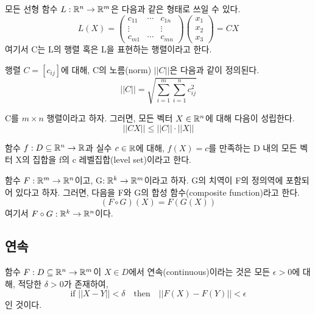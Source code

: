 \begin{theorem}
모든 선형 함수 $L: \mathbb{R}^n \to \mathbb{R}^m$은 다음과 같은 형태로 쓰일 수 있다.
\begin{equation*}
L(X)=\begin{pmatrix}
    c_{11} & \cdots & c_{1n} \\
    \vdots &  & \vdots \\
    c_{m1} & \cdots & c_{mn}
\end{pmatrix}
\begin{pmatrix}
x_1 \\ x_2 \\ x_3
\end{pmatrix}
=CX
\end{equation*}
여기서 C는 L의 행렬 혹은 L을 표현하는 행렬이라고 한다.
\end{theorem}

\begin{definition}[행렬 노름]
행렬 $C=[c_{ij}]$에 대해, C의 노름(norm) $||C||$은 다음과 같이 정의된다.
$$||C||=\sqrt{\sum_{i=1}^m \sum_{i=1}^n c_{ij}^2}$$
\end{definition}

\begin{theorem}
C를 $m \times n$ 행렬이라고 하자. 그러면, 모든 벡터 $X \in \mathbb{R}^n$에 대해 다음이 성립한다.
$$||CX|| \leq ||C|| \cdot ||X||$$
\end{theorem}

\begin{definition}[레벨 집합]
함수 $f: D \subseteq \mathbb{R}^n \to \mathbb{R}$과 실수 $c \in \mathbb{R}$에 대해, $f(X)=c$를 만족하는 D 내의 모든 벡터 X의 집합을 f의 c 레벨집합(level set)이라고 한다.
\end{definition}

\begin{definition}[함수 합성]
함수 $F: \mathbb{R}^m \to \mathbb{R}^n$이고, G$: \mathbb{R}^k \to \mathbb{R}^m$이라고 하자. G의 치역이 F의 정의역에 포함되어 있다고 하자. 그러면, 다음을 F와 G의 합성 함수(composite function)라고 한다.
$$(F \circ G) (X) = F(G(X))$$
여기서 $F \circ G : \mathbb{R}^k \to \mathbb{R}^n$이다.
\end{definition}

\subsection{연속}
\begin{definition}[함수의 연속]
함수 $F:D \subseteq \mathbb{R}^n \to \mathbb{R}^m$이 $X \in D$에서 연속(continuous)이라는 것은 모든 $\epsilon >0$에 대해, 적당한 $\delta >0$가 존재하여,
$$\text{if } ||X-Y|| < \delta \quad \text{then} \quad ||F(X)-F(Y)||<\epsilon$$
인 것이다.
\end{definition}

